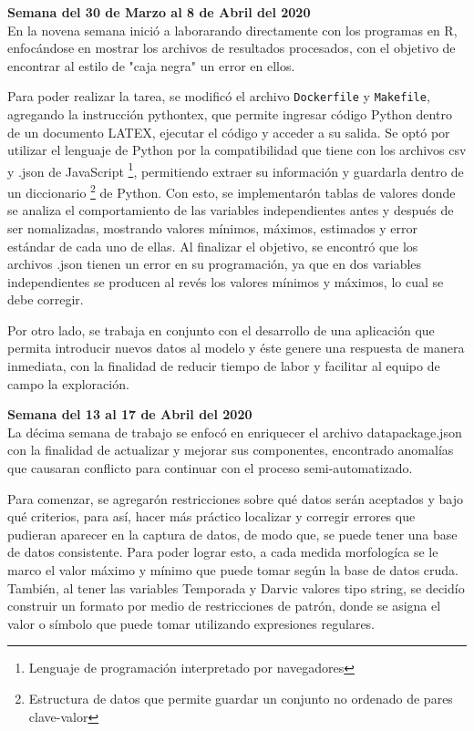 \documentclass{article}
\begin{document}
    \textbf{Semana  del 30 de Marzo al 8 de Abril del 2020} \\
    En la novena semana inició a laborarando directamente con los programas en R, enfocándose en mostrar los archivos de resultados procesados, con el objetivo de encontrar al estilo de "caja negra" un error en ellos.
    
    Para poder realizar la tarea, se modificó el archivo \texttt{Dockerfile} y \texttt{Makefile}, agregando la instrucción pythontex, que permite ingresar código Python dentro de un documento LATEX, ejecutar el código y acceder a su salida. Se optó por utilizar el lenguaje de Python por la compatibilidad que tiene con los archivos csv y .json de JavaScript \footnote{Lenguaje de programación interpretado por navegadores}, permitiendo extraer su información y guardarla dentro de un diccionario \footnote{Estructura de datos que permite guardar un conjunto no ordenado de pares clave-valor} de Python. Con esto, se implementarón tablas de valores donde se analiza el comportamiento de las variables independientes antes y después de ser nomalizadas, mostrando valores mínimos, máximos, estimados y error estándar de cada uno de ellas.
    Al finalizar el objetivo, se encontró que los archivos .json tienen un error en su programación, ya que en dos variables independientes se producen al revés los valores mínimos y máximos, lo cual se debe corregir.
    
    Por otro lado, se trabaja en conjunto con el desarrollo de una aplicación que permita introducir nuevos datos al modelo y éste genere una respuesta de manera inmediata, con la finalidad de reducir tiempo de labor y  facilitar al equipo de campo la exploración.
    
    \textbf{Semana del 13 al 17 de Abril del 2020} \\
    La décima semana de trabajo se enfocó en enriquecer el archivo datapackage.json con la finalidad de actualizar y mejorar sus componentes, encontrado anomalías que causaran conflicto para continuar con el proceso semi-automatizado.
    
    Para comenzar, se agregarón restricciones sobre qué datos serán aceptados y bajo qué criterios, para así, hacer más práctico localizar y corregir errores que pudieran aparecer en la captura de datos, de modo que, se puede tener una base de datos consistente. Para poder lograr esto, a cada medida morfologíca se le marco el valor máximo y mínimo que puede tomar según la base de datos cruda. También, al tener las variables Temporada y Darvic valores tipo string, se decidío construir un formato por medio de restricciones de patrón, donde se asigna el valor o símbolo que puede tomar utilizando expresiones regulares.
    
\end{document}
